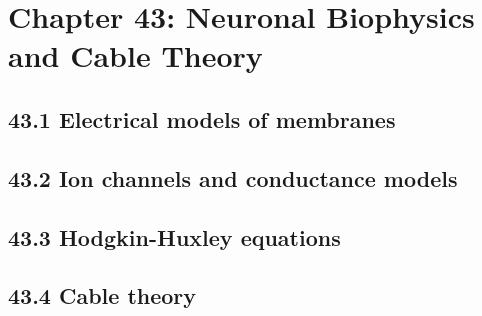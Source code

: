 \section{Chapter 43: Neuronal Biophysics and Cable Theory}

\subsection{43.1 Electrical models of membranes}

\subsection{43.2 Ion channels and conductance models}

\subsection{43.3 Hodgkin-Huxley equations}

\subsection{43.4 Cable theory}

\clearpage
